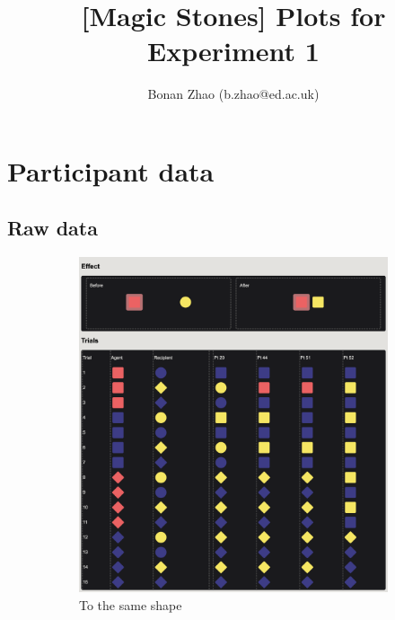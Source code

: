 \documentclass{article}
\title{[Magic Stones] Plots for Experiment 1}
\author{Bonan Zhao (b.zhao@ed.ac.uk)}
\begin{document}
\maketitle

\section{Participant data}
\subsection{Raw data}

\begin{figure}[h!]
	\centering
  \begin{subfigure}[t]{0.31\textwidth}
  	\centering
  	\includegraphics[width=\linewidth]{raw_g1} 
  	\caption{To the same shape} \label{fig:raw_g1}
  \end{subfigure}
  \hfill
  \begin{subfigure}[t]{0.31\textwidth}
  	\centering

\end{subfigure}
\end{figure}
\end{document}
